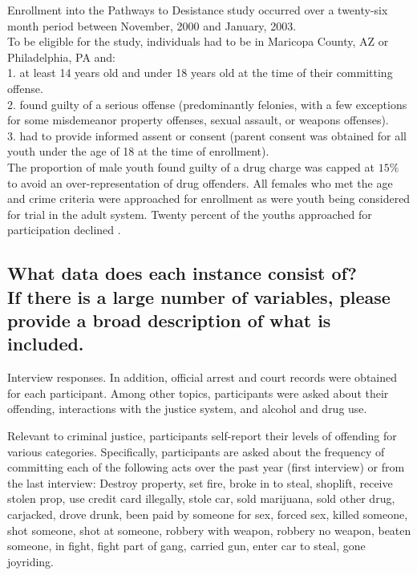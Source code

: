 \documentclass[letterpaper, 10 pt, conference]{ieeeconf}  %
\newcommand{\subtitle}[1]{{\\ \small \normalfont \color{purple} #1}}
\begin{document}
Enrollment into the Pathways to Desistance study occurred over a twenty-six month period between November, 2000 and January, 2003. \\

To be eligible for the study, individuals had to be in Maricopa County, AZ or Philadelphia, PA and: \\
1. at least 14 years old and under 18 years old at the time of their committing offense. \\
2. found guilty of a serious offense (predominantly felonies, with a few exceptions for some misdemeanor property offenses, sexual assault, or weapons offenses). \\
3. had to provide informed assent or consent (parent consent was obtained for all youth under the age of 18 at the time of enrollment). \\

The proportion of male youth found guilty of a drug charge was capped at $15\%$ to avoid an over-representation of drug offenders. All females who met the age and crime criteria were approached for enrollment as were youth being considered for trial in the adult system. Twenty percent of the youths approached for participation declined \cite{pathways_website}.

\subsection{What data does each instance consist of? \subtitle{If there is a large number of variables, please provide a broad description of what is included.}}

Interview responses. In addition, official arrest and court records were obtained for each participant. Among other topics, participants were asked about their offending, interactions with the justice system, and alcohol and drug use.

Relevant to criminal justice, participants self-report their levels of offending for various categories. Specifically, participants are asked about the frequency of committing each of the following acts over the past year (first interview) or from the last interview: Destroy property, set fire, broke in to steal, shoplift, receive stolen prop, use credit card illegally, stole car, sold marijuana, sold other drug, carjacked, drove drunk, been paid by someone for sex, forced sex, killed someone, shot someone, shot at someone, robbery with weapon, robbery no weapon, beaten someone, in fight, fight part of gang, carried gun, enter car to steal, gone joyriding. \\
\end{document}

